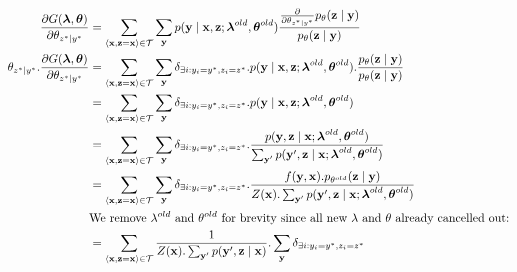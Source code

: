 \documentclass[11pt,onecolumn]{article}
\begin{document}
\begin{align}
\frac{\partial G(\boldsymbol{\lambda}, \boldsymbol{\theta})}{\partial \theta_{z^*\mid y^*}} &=
  \sum_{\langle\mathbf{x},\mathbf{z}=\mathbf{x}\rangle \in \cal{T}} 
    \sum_\mathbf{y} 
      p(\mathbf{y}\mid\mathbf{x}, \mathbf{z}; \boldsymbol{\lambda}^{old}, \boldsymbol{\theta}^{old}) 
      \frac
        { 
          \frac{\partial}{\partial \theta_{z^*\mid y^*}}  p_\theta(\mathbf{z} \mid \mathbf{y}) 
        }
        {
          p_\theta(\mathbf{z} \mid \mathbf{y})
        } \\
\theta_{z^*\mid y^*}.\frac{\partial G(\boldsymbol{\lambda}, \boldsymbol{\theta})}{\partial \theta_{z^*\mid y^*}} &=
  \sum_{\langle\mathbf{x},\mathbf{z}=\mathbf{x}\rangle \in \cal{T}} 
    \sum_\mathbf{y}
      \delta_{\exists i:y_i=y^*, z_i=z^*}
      . p(\mathbf{y}\mid\mathbf{x}, \mathbf{z}; \boldsymbol{\lambda}^{old}, \boldsymbol{\theta}^{old})
      . \frac
        { 
          p_\theta(\mathbf{z} \mid \mathbf{y})
        }
        {
          p_\theta(\mathbf{z} \mid \mathbf{y})
        } \\
&=
  \sum_{\langle\mathbf{x},\mathbf{z}=\mathbf{x}\rangle \in \cal{T}} 
    \sum_\mathbf{y}
      \delta_{\exists i:y_i=y^*, z_i=z^*}
      . p(\mathbf{y}\mid\mathbf{x}, \mathbf{z}; \boldsymbol{\lambda}^{old}, \boldsymbol{\theta}^{old}) \\
&= 
  \sum_{\langle\mathbf{x},\mathbf{z}=\mathbf{x}\rangle \in \cal{T}} 
    \sum_\mathbf{y}
      \delta_{\exists i:y_i=y^*, z_i=z^*}
      . \frac{p(\mathbf{y}, \mathbf{z} \mid \mathbf{x}; \boldsymbol{\lambda}^{old}, \boldsymbol{\theta}^{old})}{\sum_{\mathbf{y'}} p(\mathbf{y'}, \mathbf{z} \mid \mathbf{x}; \boldsymbol{\lambda}^{old}, \boldsymbol{\theta}^{old})} \\
&= 
  \sum_{\langle\mathbf{x},\mathbf{z}=\mathbf{x}\rangle \in \cal{T}} 
    \sum_\mathbf{y}
      \delta_{\exists i:y_i=y^*, z_i=z^*}
      . \frac{f(\mathbf{y},\mathbf{x}).p_{\theta^{old}}(\mathbf{z}\mid\mathbf{y})}{Z(\mathbf{x}).\sum_{\mathbf{y'}} p(\mathbf{y'}, \mathbf{z} \mid \mathbf{x}; \boldsymbol{\lambda}^{old}, \boldsymbol{\theta}^{old})}\\
&\text{We remove $\lambda^{old}$ and $\theta^{old}$ for brevity since all new $\lambda$ and $\theta$ already cancelled out:} \nonumber \\
&= 
  \sum_{\langle\mathbf{x},\mathbf{z}=\mathbf{x}\rangle \in \cal{T}} 
    \frac{1}{Z(\mathbf{x}).\sum_{\mathbf{y'}} p(\mathbf{y'}, \mathbf{z} \mid \mathbf{x})}
    . \sum_\mathbf{y}
      \delta_{\exists i:y_i=y^*, z_i=z^*}

\end{align}
\end{document}

